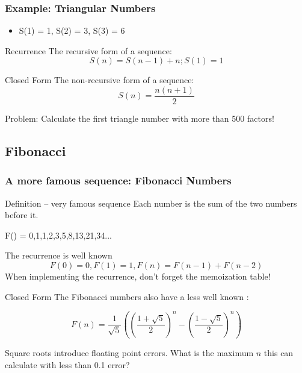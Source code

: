 \documentclass{beamer}
\begin{document}
\begin{frame}
  \frametitle{Example: Triangular Numbers}
  {\smaller
    \begin{itemize}
    \item S(1) = 1, S(2) = 3, S(3) = 6
    \end{itemize}

    \begin{block}{Recurrence}
      The recursive form of a sequence:
      \begin{equation*}
        S(n) = S(n-1)+n; S(1) = 1
      \end{equation*}
    \end{block}
    \begin{block}{Closed Form}
      The non-recursive form of a sequence:
      \begin{equation*}
        S(n) = \frac{n(n+1)}{2}
      \end{equation*}
    \end{block}
    \alert{Problem:} Calculate the first triangle number with more
    than 500 factors!  }
\end{frame}

\subsection{Fibonacci}

\begin{frame}
  \frametitle{A more famous sequence: Fibonacci Numbers}

  {\smaller
  \begin{block}{Definition -- very famous sequence}
    Each number is the sum of the two numbers before it.

    \medskip

    F() = 0,1,1,2,3,5,8,13,21,34...    
  \end{block}

  \begin{block}{The recurrence is well known}
  \begin{equation*}
  F(0) = 0, F(1) = 1, F(n) = F(n-1)+F(n-2)
  \end{equation*}
  When implementing the recurrence, don't forget the memoization
  table!
  \end{block}

  \begin{block}{Closed Form}
    The Fibonacci numbers also have a less well known
    :
    
    \begin{equation*}
      F(n) = \frac{1}{\sqrt{5}}\left(\left(\frac{1+\sqrt{5}}{2}\right)^n-\left(\frac{1-\sqrt{5}}{2}\right)^n\right)
    \end{equation*}
  \end{block}
    Square roots introduce floating point errors. What is the maximum
    $n$ this can calculate with less than 0.1 error?
  }
\end{frame}
\end{document}
